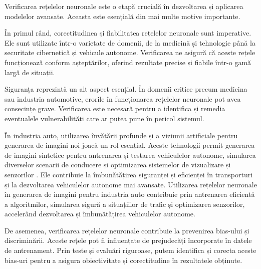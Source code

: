 \hspace{0.5 cm}
Verificarea rețelelor neuronale este o etapă crucială în dezvoltarea și aplicarea modelelor avansate. Aceasta este esențială din mai multe motive importante.

În primul rând, corectitudinea și fiabilitatea rețelelor neuronale sunt imperative. Ele sunt utilizate într-o varietate de domenii, de la medicină și tehnologie până la securitate cibernetică și vehicule autonome. Verificarea ne asigură că aceste rețele funcționează conform așteptărilor, oferind rezultate precise și fiabile într-o gamă largă de situații.

Siguranța reprezintă un alt aspect esențial. În domenii critice precum medicina sau industria automotive, erorile în funcționarea rețelelor neuronale pot avea consecințe grave. Verificarea este necesară pentru a identifica și remedia eventualele vulnerabilități care ar putea pune în pericol sistemul.

În industria auto, utilizarea învățării profunde și a viziunii artificiale pentru generarea de imagini noi joacă un rol esențial. Aceste tehnologii permit generarea de imagini sintetice pentru antrenarea și testarea vehiculelor autonome, simularea diverselor scenarii de conducere și optimizarea sistemelor de vizualizare și senzorilor \cite{googleAppliedDeep}. Ele contribuie la îmbunătățirea siguranței și eficienței în transporturi și la dezvoltarea vehiculelor autonome mai avansate. Utilizarea rețelelor neuronale în generarea de imagini pentru industria auto contribuie prin antrenarea eficientă a algoritmilor, simularea sigură a situațiilor de trafic și optimizarea senzorilor, accelerând dezvoltarea și îmbunătățirea vehiculelor autonome.

De asemenea, verificarea rețelelor neuronale contribuie la prevenirea bias-ului și discriminării. Aceste rețele pot fi influențate de prejudecăți încorporate în datele de antrenament. Prin teste și evaluări riguroase, putem identifica și corecta aceste bias-uri pentru a asigura obiectivitate și corectitudine în rezultatele obținute.